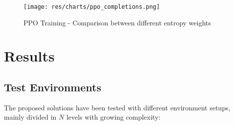\documentclass[12pt]{article}
\begin{document}
\begin{figure}[H]
        \centerline{\texttt{[image: res/charts/ppo\_completions.png]}}
        \caption{PPO Training - Comparison between different entropy weights}
\end{figure}

\section{Results}

\subsection{Test Environments}

The proposed solutions have been tested with different environment setups, mainly divided in $N$ levels with growing complexity:
\end{document}
